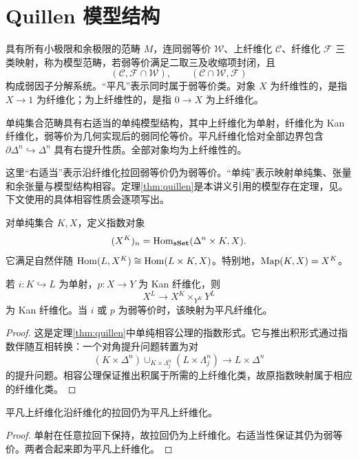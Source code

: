 \section{Quillen 模型结构}
\begin{definition}[模型范畴]
具有所有小极限和余极限的范畴 $M$，连同弱等价 $\mathcal W$、上纤维化 $\mathcal C$、纤维化 $\mathcal F$ 三类映射，称为模型范畴，若弱等价满足二取三及收缩项封闭，且
\[
(\mathcal C,\mathcal F\cap\mathcal W),
\qquad(\mathcal C\cap\mathcal W,\mathcal F)
\]
构成弱因子分解系统。“平凡”表示同时属于弱等价类。对象 $X$ 为纤维性的，是指 $X\to1$ 为纤维化；为上纤维性的，是指 $0\to X$ 为上纤维化。
\end{definition}
\begin{theorem}\label{thm:quillen}
单纯集合范畴具有右适当的单纯模型结构，其中上纤维化为单射，纤维化为 Kan 纤维化，弱等价为几何实现后的弱同伦等价。平凡纤维化恰对全部边界包含 $\partial\Delta^n\hookrightarrow\Delta^n$ 具有右提升性质。全部对象均为上纤维性的。
\end{theorem}
\begin{remark}
这里“右适当”表示沿纤维化拉回弱等价仍为弱等价。“单纯”表示映射单纯集、张量和余张量与模型结构相容。定理\ref{thm:quillen}是本讲义引用的模型存在定理，见\cite{Quillen,GoerssJardine}。下文使用的具体相容性质会逐项写出。
\end{remark}
\begin{definition}[单纯映射对象]
对单纯集合 $K,X$，定义指数对象
\[
(X^K)_n=\operatorname{Hom}_{\mathbf{sSet}}(\Delta^n\times K,X).
\]
它满足自然伴随 $\operatorname{Hom}(L,X^K)\cong\operatorname{Hom}(L\times K,X)$。特别地，$\operatorname{Map}(K,X)=X^K$。
\end{definition}
\begin{proposition}[指数映射的提升性质]\label{prop:SM7}
若 $i:K\hookrightarrow L$ 为单射，$p:X\to Y$ 为 Kan 纤维化，则
\[
X^L\longrightarrow X^K\times_{Y^K}Y^L
\]
为 Kan 纤维化。当 $i$ 或 $p$ 为弱等价时，该映射为平凡纤维化。
\end{proposition}
\begin{proof}
这是定理\ref{thm:quillen}中单纯相容公理的指数形式。它与推出积形式通过指数伴随互相转换：一个对角提升问题转置为对
\[
(K\times\Delta^n)\cup_{K\times\Lambda_j^n}(L\times\Lambda_j^n)
\longrightarrow L\times\Delta^n
\]
的提升问题。相容公理保证推出积属于所需的上纤维化类，故原指数映射属于相应的纤维化类。
\end{proof}
\begin{proposition}[Frobenius 性质]
平凡上纤维化沿纤维化的拉回仍为平凡上纤维化。
\end{proposition}
\begin{proof}
单射在任意拉回下保持，故拉回仍为上纤维化。右适当性保证其仍为弱等价。两者合起来即为平凡上纤维化。
\end{proof}

